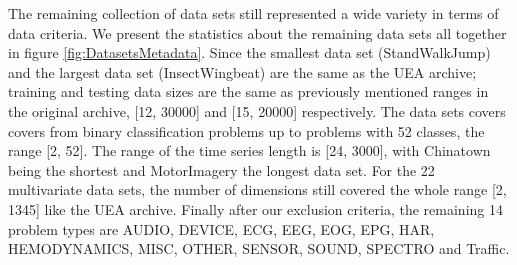 The remaining collection of data sets still represented a wide variety in terms of data criteria.
We present the statistics about the remaining data sets all together in figure \ref{fig:DatasetsMetadata}.
Since the smallest data set (StandWalkJump) and the largest data set (InsectWingbeat) are the same as the UEA archive; training and testing data sizes are the same as previously mentioned ranges in the original archive, [12, 30000] and [15, 20000] respectively.
The data sets covers covers from binary classification problems up to problems with 52 classes, the range [2, 52].
The range of the time series length is [24, 3000], with Chinatown being the shortest and MotorImagery the longest data set.
For the 22 multivariate data sets, the number of dimensions still covered the whole range [2, 1345] like the UEA archive.
Finally after our exclusion criteria, the remaining 14 problem types are AUDIO, DEVICE, ECG, EEG, EOG, EPG, HAR, HEMODYNAMICS, MISC, OTHER, SENSOR, SOUND, SPECTRO and Traffic.

